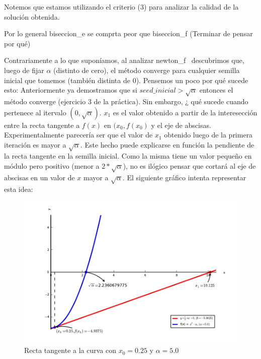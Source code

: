 Notemos que estamos utilizando el criterio (3) para analizar la calidad de la solución obtenida.

Por lo general biseccion\_e se comprta peor que biseccion\_f (Terminar de pensar por qué)

Contrariamente a lo que suponíamos, al analizar newton\_f \ descubrimos que, luego de fijar $\alpha$ (distinto de cero), el método converge para cualquier semilla inicial que tomemos (también distinta de 0).
Pensemos un poco por qué sucede esto: 
Anteriormente ya demostramos que si $seed\_inicial > \sqrt{\alpha}$ entonces el método converge (ejercicio 3 de la práctica). 
Sin embargo, ¿ qué sucede cuando pertenece al itervalo $(0,\sqrt{\alpha})$. $x_1$ es el valor 
obtenido a partir de la interesección entre la recta tangente a $f(x)$ en $(x_0,f(x_0)$ y el eje de abscisas. Experimentalmente parecería ser que el valor de $x_1$ obtenido luego de la primera 
iteración es mayor a $\sqrt{\alpha}$. Este hecho puede explicarse en función la pendiente de la recta tangente en la semilla inicial. Como la misma tiene un valor peque\~no en módulo pero positivo
(menor a $2*\sqrt{\alpha}$), no es ilógico pensar que cortará al eje de abscisas en un valor de $x$ mayor a  $\sqrt{\alpha}$. El siguiente gráfico intenta representar esta idea:  

\begin{figure}[!h]
	\begin{center}
		  \includegraphics[keepaspectratio]{../Imagenes/exp1/recta_tangente.pdf}
		  \caption{Recta tangente a la curva con $x_0=0.25$ y $\alpha=5.0$}
		  \label{fig:contra1}
	\end{center}
\end{figure}
\FloatBarrier

